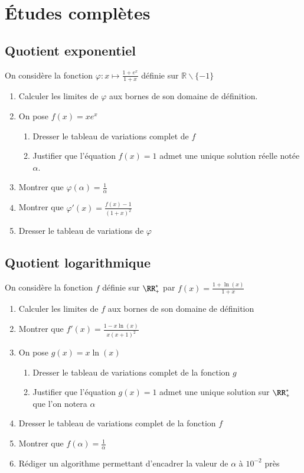 \documentclass[oneside,12pt]{article}          %
\begin{document}
\section{Études complètes}

\subsection{Quotient exponentiel}
On considère la fonction $\varphi : x \mapsto \frac{1 + e^x}{1 + x}$ définie sur $\mathbb{R} \backslash \{-1\}$
\begin{enumerate}
    \item Calculer les limites de $\varphi$ aux bornes de son domaine de définition.
    \item On pose $f(x) = x e^x$
    \begin{enumerate}
        \item Dresser le tableau de variations complet de $f$
        \item Justifier que l'équation $f(x) = 1$ admet une unique solution réelle notée $\alpha$.
    \end{enumerate}
    \item Montrer que $\varphi(\alpha) = \frac{1}{\alpha}$
    \item Montrer que $\varphi'(x) = \frac{f(x) - 1}{(1 + x)^2}$
    \item Dresser le tableau de variations de $\varphi$
\end{enumerate}



\subsection{Quotient logarithmique}
On considère la fonction $f$ définie sur $\RR_+^*$ par $f(x)=\frac{1+\ln(x)}{1+x}$
\begin{enumerate}
    \item Calculer les limites de $f$ aux bornes de son domaine de définition
    \item Montrer que $f'(x)=\frac{1-x\ln(x)}{x(x+1)^2}$
    \item On pose $g(x)=x\ln(x)$
    \begin{enumerate}
        \item Dresser le tableau de variations complet de la fonction $g$
        \item Justifier que l'équation $g(x)=1$ admet une unique solution sur $\RR^*_+$ que l'on notera $\alpha$
    \end{enumerate}
    \item Dresser le tableau de variations complet de la fonction $f$
    \item Montrer que $f(\alpha)=\frac{1}{\alpha}$
    \item Rédiger un algorithme permettant d'encadrer la valeur de $\alpha$ à $10^{-2}$ près
\end{enumerate}
\end{document}
